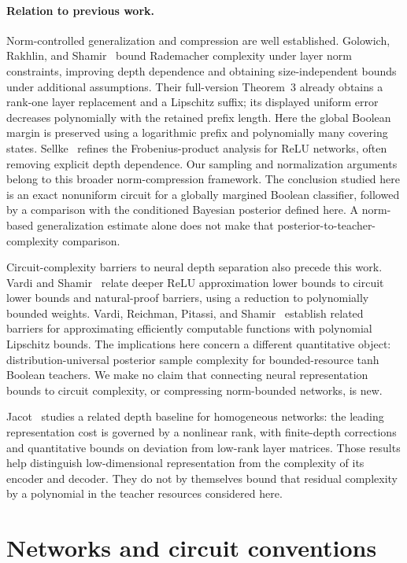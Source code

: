 \documentclass[11pt]{article}
\theoremstyle{remark}
\begin{document}
\paragraph{Relation to previous work.}
Norm-controlled generalization and compression are well established.
Golowich, Rakhlin, and Shamir~\cite{grs} bound Rademacher complexity
under layer norm constraints, improving depth dependence and obtaining
size-independent bounds under additional assumptions.
Their full-version Theorem~3 already obtains a rank-one layer
replacement and a Lipschitz suffix; its displayed uniform error
decreases polynomially with the retained prefix length.
Here the global Boolean margin is preserved using a logarithmic
prefix and polynomially many covering states.
Sellke~\cite{sellke} refines the Frobenius-product analysis for ReLU
networks, often removing explicit depth dependence.
Our sampling and normalization arguments belong to this broader
norm-compression framework. The conclusion studied here is an exact
nonuniform circuit for a globally margined Boolean classifier, followed
by a comparison with the conditioned Bayesian posterior defined here.
A norm-based generalization estimate alone does not make that
posterior-to-teacher-complexity comparison.

Circuit-complexity barriers to neural depth separation also precede
this work. Vardi and Shamir~\cite{vardi-shamir} relate deeper ReLU
approximation lower bounds to circuit lower bounds and natural-proof
barriers, using a reduction to polynomially bounded weights.
Vardi, Reichman, Pitassi, and Shamir~\cite{vardi-benign} establish
related barriers for approximating efficiently computable functions
with polynomial Lipschitz bounds. The implications here concern a
different quantitative object: distribution-universal posterior
sample complexity for bounded-resource tanh Boolean teachers.
We make no claim that connecting neural representation bounds to
circuit complexity, or compressing norm-bounded networks, is new.

Jacot~\cite{jacot-rank,jacot-bottleneck} studies a related depth
baseline for homogeneous networks: the leading representation
cost is governed by a nonlinear rank, with finite-depth corrections
and quantitative bounds on deviation from low-rank layer matrices.
Those results help distinguish low-dimensional representation from
the complexity of its encoder and decoder. They do not by themselves
bound that residual complexity by a polynomial in the teacher
resources considered here.

\section{Networks and circuit conventions}
\label{sec:conventions}
\end{document}
